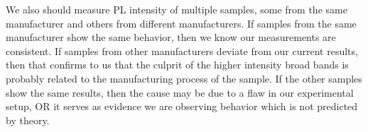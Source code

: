 	We also should measure PL intensity of multiple samples, some from the same manufacturer and others from different manufacturers. If samples from the same manufacturer show the same behavior, then we know our measurements are consistent. If samples from other manufacturers deviate from our current results, then that confirms to us that the culprit of the higher intensity broad bands is probably related to the manufacturing process of the sample. If the other samples show the same results, then the cause may be due to a flaw in our experimental setup, OR it serves as evidence we are observing behavior which is not predicted by theory.
